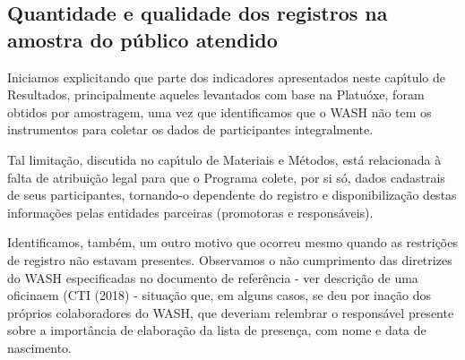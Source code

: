 \documentclass[
12pt,		%
openright,	%
twoside,  %
a4paper,			%
chapter=TITLE,		%
english,			%
french,				%
spanish,			%
brazil				%
]{USPSC-classe/USPSC}
\begin{document}
\subsection[Quantidade e qualidade dos registros na amostra do p\'ublico atendido]{Quantidade e qualidade dos registros na amostra do p\'ublico atendido}\label{Quantidade e qualidade dos registros na amostra do p\'ublico atendido}
Iniciamos explicitando que parte dos indicadores apresentados neste cap\'{\i}tulo de Resultados, principalmente aqueles levantados com base na Platu\'oxe, foram obtidos por amostragem, uma vez que identificamos que o WASH n\~ao tem os instrumentos para coletar os dados de participantes integralmente.

















Tal limita\c{c}\~ao, discutida no cap\'{\i}tulo de Materiais e M\'etodos, est\'a relacionada \`a falta de atribui\c{c}\~ao legal para que o Programa colete, por si s\'o, dados cadastrais de seus participantes, tornando-o dependente do registro e disponibiliza\c{c}\~ao destas informa\c{c}\~oes pelas entidades parceiras (promotoras e respons\'aveis).

















Identificamos, tamb\'em, um outro motivo que ocorreu mesmo quando as restri\c{c}\~oes de registro n\~ao estavam presentes. Observamos o n\~ao cumprimento das diretrizes do WASH especificadas no documento de refer\^encia - ver \textquotedbl descri\c{c}\~ao de uma oficina\textquotedbl  em (CTI (2018) - situa\c{c}\~ao que, em alguns casos, se deu por ina\c{c}\~ao dos pr\'oprios colaboradores do WASH, que deveriam relembrar o respons\'avel presente sobre a import\^ancia de elabora\c{c}\~ao da lista de presen\c{c}a, com nome e data de nascimento.
\end{document}

